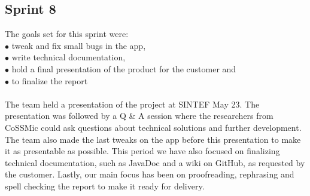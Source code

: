 \subsection{Sprint 8}
The goals set for this sprint were:\\
$\bullet$\hspace{0.25cm} tweak and fix small bugs in the app,\\
$\bullet$\hspace{0.25cm} write technical documentation,\\
$\bullet$\hspace{0.25cm} hold a final presentation of the product for the customer and\\
$\bullet$\hspace{0.25cm} to finalize the report\\\\
The team held a presentation of the project at SINTEF May 23. The presentation was followed by a Q \& A session where the researchers from CoSSMic could ask questions about technical solutions and further development. The team also made the last tweaks on the app before this presentation to make it as presentable as possible. This period we have also focused on finalizing technical documentation, such as JavaDoc and a wiki on GitHub, as requested by the customer. Lastly, our main focus has been on proofreading, rephrasing and spell checking the report to make it ready for delivery.
